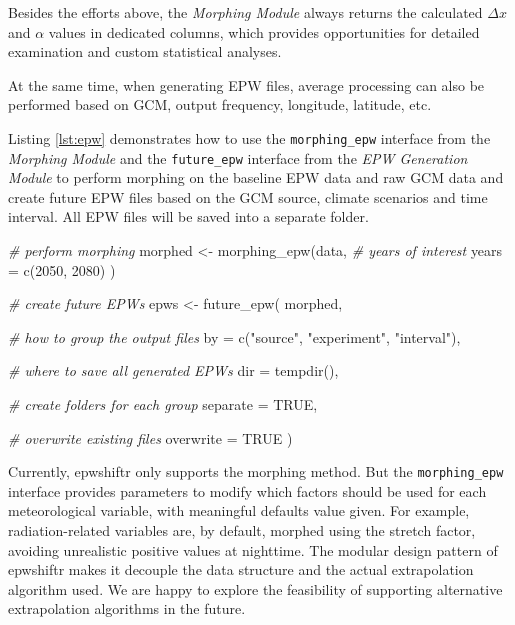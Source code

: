 \documentclass[twocolumn, a4paper,10pt]{article}
\newenvironment{Shaded}{\begin{mdframed}[skipabove=0pt]}{\end{mdframed}}
\newcommand{\AttributeTok}[1]{\textcolor[rgb]{0.77,0.63,0.00}{#1}}
\newcommand{\CommentTok}[1]{\textcolor[rgb]{0.56,0.35,0.01}{\textit{#1}}}
\newcommand{\ConstantTok}[1]{\textcolor[rgb]{0.00,0.00,0.00}{#1}}
\newcommand{\DecValTok}[1]{\textcolor[rgb]{0.00,0.00,0.81}{#1}}
\newcommand{\FunctionTok}[1]{\textcolor[rgb]{0.00,0.00,0.00}{#1}}
\newcommand{\NormalTok}[1]{#1}
\newcommand{\OtherTok}[1]{\textcolor[rgb]{0.56,0.35,0.01}{#1}}
\newcommand{\StringTok}[1]{\textcolor[rgb]{0.31,0.60,0.02}{#1}}
\begin{document}
Besides the efforts above, the \emph{Morphing Module} always returns the calculated
\(\Delta x\) and \(\alpha\) values in dedicated columns, which provides
opportunities for detailed examination and custom statistical analyses.

At the same time, when generating EPW files, average processing can also be
performed based on GCM, output frequency, longitude, latitude, etc.

Listing \ref{lst:epw} demonstrates how to use the \texttt{morphing\_epw} interface from
the \emph{Morphing Module} and the \texttt{future\_epw} interface from the \emph{EPW Generation
Module} to perform morphing on the baseline EPW data and raw GCM data and
create future EPW files based on the GCM source, climate scenarios and time
interval. All EPW files will be saved into a separate folder.

\label{lst:epw}

\begin{Shaded}
\begin{Highlighting}[]
\CommentTok{\# perform morphing}
\NormalTok{morphed }\OtherTok{\textless{}{-}} \FunctionTok{morphing\_epw}\NormalTok{(data,}
  \CommentTok{\# years of interest}
  \AttributeTok{years =} \FunctionTok{c}\NormalTok{(}\DecValTok{2050}\NormalTok{, }\DecValTok{2080}\NormalTok{)}
\NormalTok{)}

\CommentTok{\# create future EPWs}
\NormalTok{epws }\OtherTok{\textless{}{-}} \FunctionTok{future\_epw}\NormalTok{(}
\NormalTok{  morphed,}

  \CommentTok{\# how to group the output files}
  \AttributeTok{by =} \FunctionTok{c}\NormalTok{(}\StringTok{"source"}\NormalTok{, }\StringTok{"experiment"}\NormalTok{, }\StringTok{"interval"}\NormalTok{),}

  \CommentTok{\# where to save all generated EPWs}
  \AttributeTok{dir =} \FunctionTok{tempdir}\NormalTok{(),}

  \CommentTok{\# create folders for each group}
  \AttributeTok{separate =} \ConstantTok{TRUE}\NormalTok{,}

  \CommentTok{\# overwrite existing files}
  \AttributeTok{overwrite =} \ConstantTok{TRUE}
\NormalTok{)}
\end{Highlighting}
\end{Shaded}

Currently, epwshiftr only supports the morphing method. But the \texttt{morphing\_epw}
interface provides parameters to modify which factors should be used for each
meteorological variable, with meaningful defaults value given. For example,
radiation-related variables are, by default, morphed using the stretch factor,
avoiding unrealistic positive values at nighttime. The modular design pattern of
epwshiftr makes it decouple the data structure and the actual extrapolation
algorithm used. We are happy to explore the feasibility of supporting
alternative extrapolation algorithms in the future.
\end{document}
